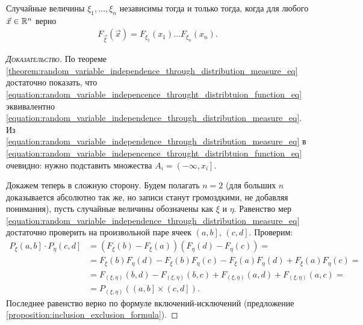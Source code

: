 \documentclass[../main.tex]{subfiles}
\begin{document}
\begin{crly}
 \label{corollary:inpendence_joint_F}
 Случайные величины $ \xi_1, \ldots, \xi_n $ независимы тогда и только тогда, когда для любого $ \vec x \in \mathbb{R}^{n} $ верно
 \begin{align}
  \label{equation:random_variable_indepencence_throught_distribtuion_function_eq}
  F_{\vec\xi}(\vec x) = F_{\xi_1}(x_1) \ldots F_{\xi_n}(x_n).
 \end{align} 
\end{crly}
\begin{proof}[\normalfont\textsc{Доказательство}]
 По теореме \ref{theorem:random_variable_independence_through_distribution_measure_eq} достаточно показать, что \eqref{equation:random_variable_indepencence_throught_distribtuion_function_eq} эквивалентно \eqref{equation:random_variable_independence_through_distribution_measure_eq}. Из \eqref{equation:random_variable_independence_through_distribution_measure_eq} в \eqref{equation:random_variable_indepencence_throught_distribtuion_function_eq} очевидно: нужно подставить множества $ A_i = \left(-\infty, x_i\right]   $.

 Докажем теперь в сложную сторону. Будем полагать $ n = 2 $ (для больших $ n $ доказывается абсолютно так же, но записи станут громоздкими, не добавляя понимания), пусть случайные величины обозначены как $ \xi $ и $ \eta $. Равенство мер \eqref{equation:random_variable_independence_through_distribution_measure_eq} достаточно проверить на произвольной паре ячеек $ \left(a, b\right]   $, $ \left(c, d\right] $. Проверим:
 \begin{align*}
  P_\xi \left(a, b\right] \cdot P_\eta \left(c, d\right] &= \left( F_\xi(b) - F_\xi(a) \right) \left( F_\eta(d) - F_\eta(c)  \right) = \\
  &= F_\xi(b)F_\eta(d) - F_\xi(b) F_\eta(c) - F_\xi(a) F_\eta(d) + F_\xi(a) F_\eta(c) = \\
  &= F_{(\xi,\eta)}(b, d) - F_{(\xi,\eta)}(b,c) + F_{(\xi,\eta)}(a,d) + F_{(\xi,\eta)}(a,c) = \\
  &= P_{(\xi,\eta)} \left( \left(a, b\right] \times \left(c, d\right]    \right).
 \end{align*} Последнее равенство верно по формуле включений-исключений (предложение \ref{proposition:inclusion_exclusion_formula}).
\end{proof}
\end{document}
